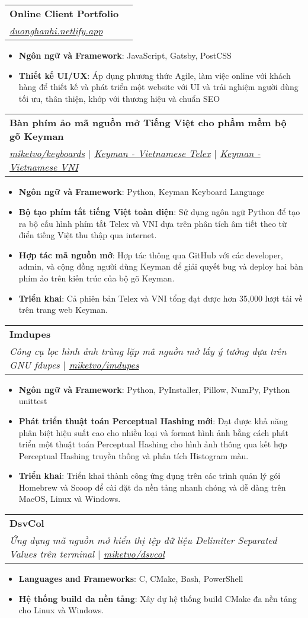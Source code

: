 \documentclass[a4paper,11pt]{article}
\makeatletter
\newcommand{\resumeItem}[2]{
  \item\small{
    \textbf{#1}{: #2 \vspace{-2pt}}
  }
}
\newcommand{\resumeSubheading}[4]{
  \vspace{-2pt}\item
    \begin{tabular*}{0.97\textwidth}{l@{\extracolsep{\fill}}r}
      \textbf{#1} & #2 \\
      \textit{\small#3} & \textit{\small #4} \\
    \end{tabular*}\vspace{-6pt}
}
\newcommand{\resumeItemListStart}{\begin{itemize}}
\newcommand{\resumeItemListEnd}{\end{itemize}\vspace{-6pt}}
\makeatother
\begin{document}
    \resumeSubheading
      {Online Client Portfolio}{}
      {\href{https://duonghanhi.netlify.app/}{\faGlobe\space duonghanhi.netlify.app}}{}
      \resumeItemListStart
        \resumeItem{Ngôn ngữ và Framework}
          {JavaScript, Gatsby, PostCSS}
        \resumeItem{Thiết kế UI/UX}
          {Áp dụng phương thức Agile, làm việc online với khách hàng để thiết kế và phát triển một website với UI và trải nghiệm người dùng tối ưu, thân thiện, khớp với thương hiệu và chuẩn SEO}
      \resumeItemListEnd

    \resumeSubheading
      {Bàn phím ảo mã nguồn mở Tiếng Việt cho phầm mềm bộ gõ Keyman}{}
      {\href{https://github.com/miketvo/keyboards}{\faGithub\space miketvo/keyboards} $|$ \href{https://keyman.com/keyboards/vietnamese_telex}{\faGlobe\space Keyman - Vietnamese Telex} $|$ \href{https://keyman.com/keyboards/vietnamese_vni}{\faGlobe\space Keyman - Vietnamese VNI}}{}
      \resumeItemListStart
        \resumeItem{Ngôn ngữ và Framework}
          {Python, Keyman Keyboard Language}
        \resumeItem{Bộ tạo phím tắt tiếng Việt toàn diện}
          {Sử dụng ngôn ngữ Python để tạo ra bộ cấu hình phím tắt Telex và VNI dựa trên phân tích âm tiết theo từ điển tiếng Việt thu thập qua internet.}
        \resumeItem{Hợp tác mã nguồn mở}
          {Hợp tác thông qua GitHub với các developer, admin, và cộng đồng người dùng Keyman để giải quyết bug và deploy hai bàn phím ảo trên kiến trúc của bộ gõ Keyman.}
        \resumeItem{Triển khai}
          {Cả phiên bản Telex và VNI tổng đạt được hơn 35,000 lượt tải về trên trang web Keyman.}
      \resumeItemListEnd

    \resumeSubheading
      {Imdupes}{}
      {Công cụ lọc hình ảnh trùng lặp mã nguồn mở lấy ý tưởng dựa trên GNU fdupes $|$ \href{https://github.com/miketvo/imdupes}{\faGithub\space miketvo/imdupes}}{}
      \resumeItemListStart
        \resumeItem{Ngôn ngữ và Framework}
          {Python, PyInstaller, Pillow, NumPy, Python unittest}
        \resumeItem{Phát triển thuật toán Perceptual Hashing mới}
          {Đạt được khả năng phân biệt hiệu suất cao cho nhiều loại và format hình ảnh bằng cách phát triển một thuật toán Perceptual Hashing cho hình ảnh thông qua kết hợp Perceptual Hashing truyền thống và phân tích Histogram màu.}
        \resumeItem{Triển khai}
          {Triển khai thành công ứng dụng trên các trình quản lý gói Homebrew và Scoop để cài đặt đa nền tảng nhanh chóng và dễ dàng trên MacOS, Linux và Windows.}
      \resumeItemListEnd

      \resumeSubheading
        {DsvCol}{}
        {Ứng dụng mã nguồn mở hiển thị tệp dữ liệu Delimiter Separated Values trên terminal $|$ \href{https://github.com/miketvo/dsvcol}{\faGithub\space miketvo/dsvcol}}{}
        \resumeItemListStart
          \resumeItem{Languages and Frameworks}
            {C, CMake, Bash, PowerShell}
          \resumeItem{Hệ thống build đa nền tảng}
            {Xây dự hệ thống build CMake đa nền tảng cho Linux và Windows.}
    \resumeItemListEnd
\end{document}
